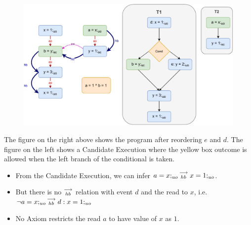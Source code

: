             \begin{figure}
                \centering 
                \includegraphics[scale=0.7]{InstructionReordering/CounterExamples1b(Conditionals).pdf}
                \caption{}
            \end{figure}
            The figure on the right above shows the program after reordering $e$ and $d$.  
            The figure on the left shows a Candidate Execution where the yellow box outcome is allowed when the left branch of the conditional is taken.
            \begin{itemize}
                \item From the Candidate Execution, we can infer $a=x;_{uo}\stackrel{\longrightarrow}{_{hb}}x=1;_{uo}$. 
                \item But there is no $\stackrel{\longrightarrow}{_{hb}}$ relation with event $d$ and the read to $x$, i.e. $\neg a=x;_{uo}\stackrel{\longrightarrow}{_{hb}}d:x=1;_{uo}$
                \item No Axiom restricts the read $a$ to have value of $x$ as $1$.
            \end{itemize}



